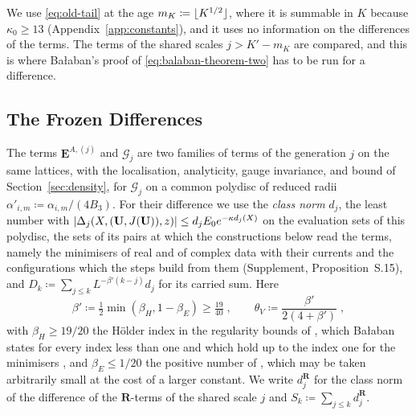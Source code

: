 \documentclass[11pt]{preprint}
\DeclarePairedDelimiter{\abs}{\lvert}{\rvert}
\DeclarePairedDelimiter{\floor}{\lfloor}{\rfloor}
\numberwithin{equation}{section}
\theoremstyle{definition}
\theoremstyle{remark}
\theoremstyle{plain}
\begin{document}
We use \eqref{eq:old-tail} at the age $m_K \coloneqq \floor{K^{1/2}}$, where it is summable in $K$ because $\kappa_0 \geq 13$ (Appendix~\ref{app:constants}), and it uses no information on the differences of the terms. The terms of the shared scales $j > K' - m_K$ are compared, and this is where Ba{\l}aban's proof of \eqref{eq:balaban-theorem-two} has to be run for a difference.

\subsection{The Frozen Differences}\label{sec:frozen-differences}

The terms $\mathbf E^{A,(j)}$ and $\mathcal G_j$ are two families of terms of the generation $j$ on the same lattices, with the localisation, analyticity, gauge invariance, and bound of Section~\ref{sec:density}, for $\mathcal G_j$ on a common polydisc of reduced radii $\alpha'_{i,m} \coloneqq \alpha_{i,m}/(4B_3)$. For their difference we use the \emph{class norm} $d_j$, the least number with $\abs{\Delta_j(X, (\mathbf U, J(\mathbf U)), z)} \leq d_jE_0e^{-\kappa d_j(X)}$ on the evaluation sets of this polydisc, the sets of its pairs at which the constructions below read the terms, namely the minimisers of real and of complex data with their currents and the configurations which the steps build from them (Supplement, Proposition~S.15), and $D_k \coloneqq \sum_{j \leq k}L^{-\beta'(k-j)}d_j$ for its carried sum. Here
\begin{equation}\label{eq:age-exponent}
    \beta' \coloneqq \tfrac12\min(\beta_H, 1 - \beta_E) \geq \tfrac{19}{40}\;,
    \qquad
    \theta_V \coloneqq \frac{\beta'}{2(4 + \beta')}\;,
\end{equation}
with $\beta_H \geq 19/20$ the H\"older index in the regularity bounds of \cite[(3.31), p.~276]{BalabanRG1}, which Ba{\l}aban states for every index less than one and which hold up to the index one for the minimisers \cite[Theorem~1, (9), p.~279]{BalabanVAR}, and $\beta_E \leq 1/20$ the positive number of \cite[(3.67), p.~283]{BalabanCRE}, which may be taken arbitrarily small at the cost of a larger constant. We write $d^{\mathbf R}_j$ for the class norm of the difference of the $\mathbf R$-terms of the shared scale $j$ and $S_k \coloneqq \sum_{j \leq k}d^{\mathbf R}_j$.
\end{document}
